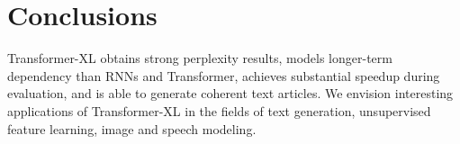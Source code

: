 \section{Conclusions}

Transformer-XL obtains strong perplexity results, models longer-term dependency than RNNs and Transformer, achieves substantial speedup during evaluation, and is able to generate coherent text articles. We envision interesting applications of Transformer-XL in the fields of text generation, unsupervised feature learning, image and speech modeling.

